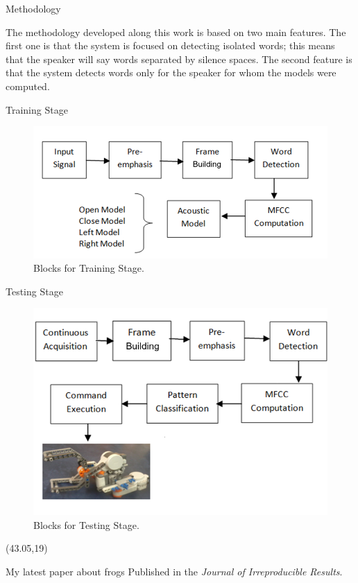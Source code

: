 \documentclass[final]{beamer}
\begin{document}
\begin{frame}{}
\begin{textblock}{39.5}
\begin{block}{Methodology}

The methodology developed along this work is based on two main features. The first one is that the system is focused on detecting isolated words; this means that the speaker will say words separated by silence spaces. The second feature is that the system detects words only for the speaker for whom the models were computed.

Training Stage

\begin{figure}[!ht]
\begin{center}
   \includegraphics[width=0.6\linewidth]{figs/1bloquesTraining}
\end{center}
   \caption{Blocks for Training Stage.}
\label{trainingBlocks}
\end{figure}

Testing Stage

\begin{figure}[!ht]
\begin{center}
   \includegraphics[width=0.6\linewidth]{figs/11bloquesTesting}
\end{center}
   \caption{Blocks for Testing Stage.}
\label{trainingBlocks}
\end{figure}
\end{block}


\end{textblock}

\begin{textblock}{39.5}(43.05,19)
\begin{block}{My latest paper about frogs}
Published in the \emph{Journal of Irreproducible Results}.
\end{block}


\end{textblock}
\end{frame}
\end{document}
